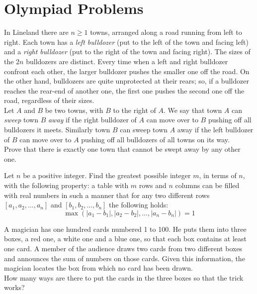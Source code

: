 \documentclass[mast]{lucky}
\begin{document}
\section{Olympiad Problems}
\begin{prob}[Shortlist 2015 C1]{6}
In Lineland there are $n\geq1$ towns, arranged along a road running from left to right. Each town has a \textit{left bulldozer} (put to the left of the town and facing left) and a \textit{right bulldozer} (put to the right of the town and facing right). The sizes of the $2n$ bulldozers are distinct. Every time when a left and right bulldozer confront each other, the larger bulldozer pushes the smaller one off the road. On the other hand, bulldozers are quite unprotected at their rears; so, if a bulldozer reaches the rear-end of another one, the first one pushes the second one off the road, regardless of their sizes.\\[1\baselineskip]Let $A$ and $B$ be two towns, with $B$ to the right of $A$. We say that town $A$ can \textit{sweep} town $B$ \textit{away} if the right bulldozer of $A$ can move over to $B$ pushing off all bulldozers it meets. Similarly town $B$ can sweep town $A$ away if the left bulldozer of $B$ can move over to $A$ pushing off all bulldozers of all towns on its way.\\[1\baselineskip]Prove that there is exactly one town that cannot be swept away by any other one.
\end{prob}

\begin{prob}[EGMO 2012/2]{6}
Let $n$ be a positive integer. Find the greatest possible integer $m$, in terms of $n$, with the following property: a table with $m$ rows and $n$ columns can be filled with real numbers in such a manner that for any two different rows $\left[ {{a_1},{a_2},\ldots,{a_n}}\right]$ and $\left[ {{b_1},{b_2},\ldots,{b_n}} \right]$ the following holds: \[\max\left( {\left| {{a_1} - {b_1}} \right|,\left| {{a_2} - {b_2}} \right|,...,\left| {{a_n} - {b_n}} \right|} \right) = 1\]
\end{prob}

\begin{prob}[IMO 2000/4]{9}
A magician has one hundred cards numbered 1 to 100. He puts them into three boxes, a red one, a white one and a blue one, so that each box contains at least one card. A member of the audience draws two cards from two different boxes and announces the sum of numbers on those cards. Given this information, the magician locates the box from which no card has been drawn.\\[1\baselineskip]How many ways are there to put the cards in the three boxes so that the trick works?
\end{prob}
\end{document}
